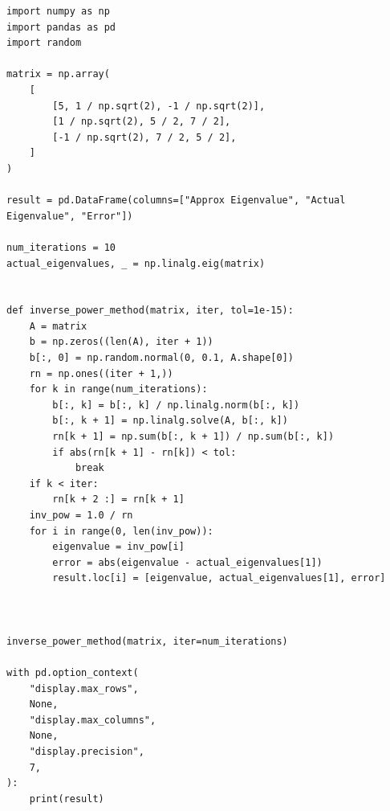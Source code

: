 \documentclass[12pt,
               a4paper,
               article,
               oneside,
               english,oldfontcommands]{memoir}
\begin{document}
\begin{lstlisting}[caption= Inverse Iteration, label={lst: inverse}]
import numpy as np
import pandas as pd
import random

matrix = np.array(
    [
        [5, 1 / np.sqrt(2), -1 / np.sqrt(2)],
        [1 / np.sqrt(2), 5 / 2, 7 / 2],
        [-1 / np.sqrt(2), 7 / 2, 5 / 2],
    ]
)

result = pd.DataFrame(columns=["Approx Eigenvalue", "Actual Eigenvalue", "Error"])

num_iterations = 10
actual_eigenvalues, _ = np.linalg.eig(matrix)


def inverse_power_method(matrix, iter, tol=1e-15):
    A = matrix
    b = np.zeros((len(A), iter + 1))
    b[:, 0] = np.random.normal(0, 0.1, A.shape[0])
    rn = np.ones((iter + 1,))
    for k in range(num_iterations):
        b[:, k] = b[:, k] / np.linalg.norm(b[:, k])
        b[:, k + 1] = np.linalg.solve(A, b[:, k])
        rn[k + 1] = np.sum(b[:, k + 1]) / np.sum(b[:, k])
        if abs(rn[k + 1] - rn[k]) < tol:
            break
    if k < iter:
        rn[k + 2 :] = rn[k + 1]
    inv_pow = 1.0 / rn
    for i in range(0, len(inv_pow)):
        eigenvalue = inv_pow[i]
        error = abs(eigenvalue - actual_eigenvalues[1])
        result.loc[i] = [eigenvalue, actual_eigenvalues[1], error]



inverse_power_method(matrix, iter=num_iterations)

with pd.option_context(
    "display.max_rows",
    None,
    "display.max_columns",
    None,
    "display.precision",
    7,
):
    print(result)
\end{lstlisting}
\end{document}
